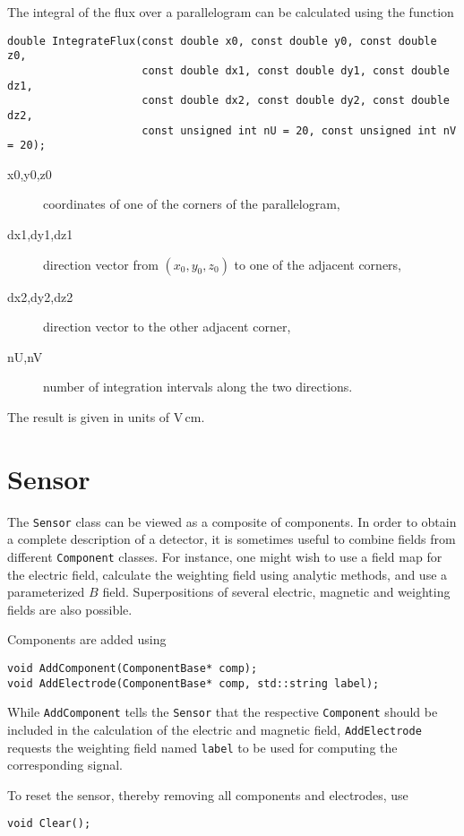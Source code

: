 The integral of the flux over a parallelogram can be calculated using 
the function
\begin{lstlisting}
double IntegrateFlux(const double x0, const double y0, const double z0,
                     const double dx1, const double dy1, const double dz1,
                     const double dx2, const double dy2, const double dz2,
                     const unsigned int nU = 20, const unsigned int nV = 20); 
\end{lstlisting}
\begin{description}
  \item[x0,y0,z0] coordinates of one of the corners of the parallelogram,
  \item[dx1,dy1,dz1] direction vector from $\left(x_{0}, y_{0}, z_{0}\right)$ 
                     to one of the adjacent corners,
  \item[dx2,dy2,dz2] direction vector to the other adjacent corner,
  \item[nU,nV] number of integration intervals along the two directions.
\end{description}
The result is given in units of V\,cm.
\section{Sensor}

The \texttt{Sensor} class can be viewed as a composite of components. 
In order to obtain a complete description of a detector, 
it is sometimes useful to combine fields from different 
\texttt{Component} classes.
For instance, one might wish to use a field map for the electric field, 
calculate the weighting field using analytic methods, 
and use a parameterized \(B\) field. 
Superpositions of several electric, magnetic and weighting fields are also possible. 


Components are added using
\begin{lstlisting}
void AddComponent(ComponentBase* comp);
void AddElectrode(ComponentBase* comp, std::string label);
\end{lstlisting}
While \texttt{AddComponent} tells the \texttt{Sensor} that the 
respective \texttt{Component} should be included in the calculation 
of the electric and magnetic field, 
\texttt{AddElectrode} requests the weighting field named \texttt{label} 
to be used for computing the corresponding signal.

To reset the sensor, thereby removing all components and electrodes, use
\begin{lstlisting}
void Clear();
\end{lstlisting}

